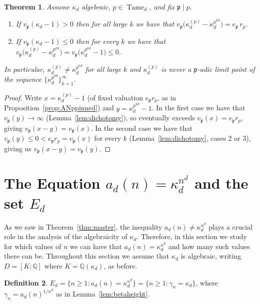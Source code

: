 \documentclass{article}
\theoremstyle{plain}
\newtheorem{theorem}{Theorem}[section]
\theoremstyle{definition}
\newtheorem{definition}[theorem]{Definition}
\theoremstyle{remark}
\newcommand{\Q}{\mathbb{Q}}
\DeclareMathOperator{\Tame}{Tame}
\begin{document}
\begin{theorem}\label{thm:comparison}
Assume $\kappa_d$ algebraic, $p\in\Tame_d$, and fix $\mathfrak p\mid p$.
\begin{enumerate}
\item If $v_\mathfrak p(\kappa_d-1)>0$ then for all large $k$ we have that $v_\mathfrak p\big(\kappa_d^{(p)}-\kappa_d^{p^{kd}}\big)=e_\mathfrak p\,r_p$.
\item If $v_\mathfrak p(\kappa_d-1)\le0$ then for every $k$ we have that $v_\mathfrak p\big(\kappa_d^{(p)}-\kappa_d^{p^{kd}}\big)=v_\mathfrak p\big(\kappa_d^{p^{kd}}-1\big)\le0$.
\end{enumerate}
In particular, $\kappa_d^{(p)}\ne\kappa_d^{p^{kd}}$ for all large $k$ and  $\kappa_d^{(p)}$ is never a $\mathfrak p$-adic limit point of the sequence $\big\{\kappa_d^{p^{kd}}\big\}_{k=1}^\infty$.
\end{theorem}
\begin{proof}
Write $x=\kappa_d^{(p)}-1$ (of fixed valuation $e_\mathfrak p r_p$, as in Proposition~\ref{prop:ANppinned}) and $y=\kappa_d^{p^{kd}}-1$. In the first case we have that $v_\mathfrak p(y)\to\infty$ (Lemma~\ref{lem:dichotomy}), so eventually exceeds $v_\mathfrak p(x)=e_\mathfrak pr_p$, giving $v_\mathfrak p(x-y)=v_\mathfrak p(x)$. In the second case we have that $v_\mathfrak p(y)\le0<e_\mathfrak p r_p=v_\mathfrak p(x)$ for every $k$ (Lemma~\ref{lem:dichotomy}, cases 2 or 3), giving us $v_\mathfrak p(x-y)=v_\mathfrak p(y)$.
\end{proof}


\section{The Equation $a_d(n)=\kappa_d^{n^d}$ and the set  $E_d$}\label{sec:Ed}

As we saw in Theorem~\ref{thm:master}, the inequality $a_d(n)\ne\kappa_d^{n^d}$ plays a crucial role in the analysis of the algebraicity of $\kappa_d$. Therefore, in this section we study for which values of $n$ we can have that $a_d(n)= \kappa_d^{n^d}$ and how many such values there can be. Throughout this section we assume that $\kappa_d$ is algebraic, writing $D=[K:\Q]$ where $K=\Q(\kappa_d)$, as before.

\begin{definition}\label{def:Ed}
$E_d=\{n\ge1 : a_d(n)=\kappa_d^{n^d}\}=\{n\ge1:\gamma_n=\kappa_d\}$, where $\gamma_n=a_d(n)^{1/n^d}$ as in Lemma~\ref{lem:betaheight}.
\end{definition}
\end{document}
